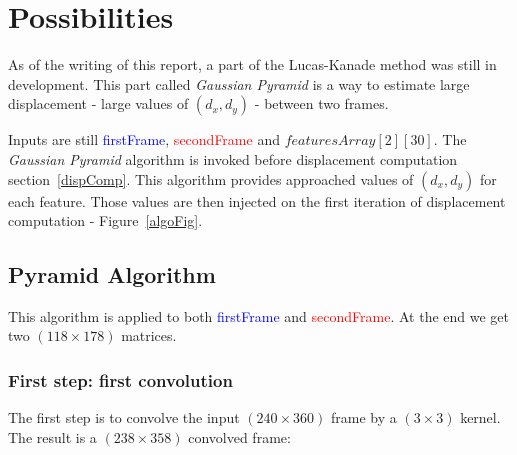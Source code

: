 \section{Possibilities}

As of the writing of this report, a part of the Lucas-Kanade method was still in development. This part called \emph{Gaussian Pyramid} is a way to estimate large displacement - large values of $(d_{x},d_{y})$ - between two frames.

Inputs are still \textcolor{blue}{firstFrame}, \textcolor{red}{secondFrame} and  $featuresArray[2][30]$. The \emph{Gaussian Pyramid} algorithm is invoked before displacement computation section~\ref{dispComp}. This algorithm provides approached values of $(d_{x},d_{y})$ for each feature. Those values are then injected on the first iteration of displacement computation - Figure~\ref{algoFig}.

\subsection{Pyramid Algorithm}

This algorithm is applied to both \textcolor{blue}{firstFrame} and \textcolor{red}{secondFrame}. At the end we get two $(118\times 178)$ matrices.


\subsubsection{First step: first convolution}

The first step is to convolve the input $(240\times 360)$ frame by a $(3\times 3)$ kernel. The result is a $(238\times 358)$ convolved frame:

\vspace{5mm}

